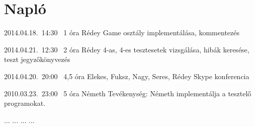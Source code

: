 %
\section{Napló}

\begin{naplo}

\bejegyzes
{2014.04.18.~14:30~} %
{1 óra} %
{Rédey} %
{Game osztály implementálása, kommentezés} %

\bejegyzes
{2014.04.21.~12:30~} %
{2 óra} %
{Rédey} %
{4-as, 4-es tesztesetek vizsgálása, hibák keresése, teszt jegyzőkönyvezés} %

\bejegyzes
{2014.04.20.~20:00~} %
{4,5 óra} %
{Elekes, Fuksz, Nagy, Seres, Rédey} %
{Skype konferencia} %

\bejegyzes
{2010.03.23.~23:00~}
{5 óra}
{Németh}
{Tevékenység: Németh implementálja a tesztelő programokat.}

\bejegyzes
{...}
{...}
{...}
{...}


\end{naplo}

